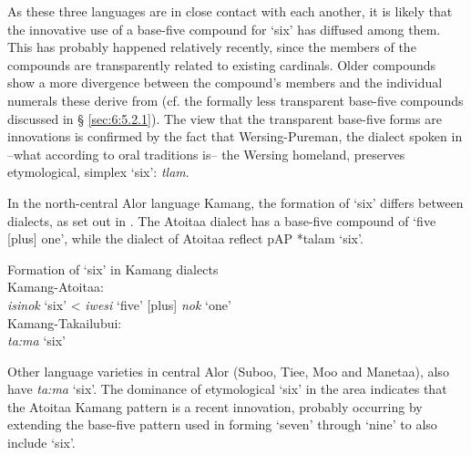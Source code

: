  

  

  

As these three languages are in close contact with each another, it is likely that the innovative use of a base-five compound for `six' has diffused among them. This has probably happened relatively recently, since the members of the compounds are transparently related to existing cardinals. Older compounds show a more divergence between the compound's members and the individual numerals these derive from (cf. the formally less transparent base-five compounds discussed in {\S} \ref{sec:6:5.2.1}). The view that the transparent base-five forms are innovations is confirmed by the fact that Wersing-Pureman, the dialect spoken in --what according to oral traditions is-- the Wersing homeland, preserves etymological, simplex `six': \textit{t{\textschwa}lam}.

In the north-central Alor language Kamang, the formation of `six' differs between dialects, as set out in . The Atoitaa dialect has a base-five compound of `five [plus] one', while the dialect of Atoitaa reflect p\textsc{AP} *talam `six'. 



\ea%
\label{ex:6:5}
Formation of `six' in Kamang dialects\\
 Kamang{}-Atoitaa: \\
\textit{isi}\textit{{\ng}}\textit{nok}\textbf{} `six'     {\textless} \textit{iwesi}\textit{{\ng}} `five' [plus] \textit{nok} `one'\\
    Kamang{}-Takailubui:\\
    \textit{ta:ma} `six'      \\ 
\z





Other language varieties in central Alor (Suboo, Tiee, Moo and Manetaa), also have \textit{ta:ma} `six'. The dominance of etymological `six' in the area indicates that the Atoitaa Kamang pattern is a recent innovation, probably occurring by extending the base-five pattern used in forming `seven' through `nine' to also include `six'. 

